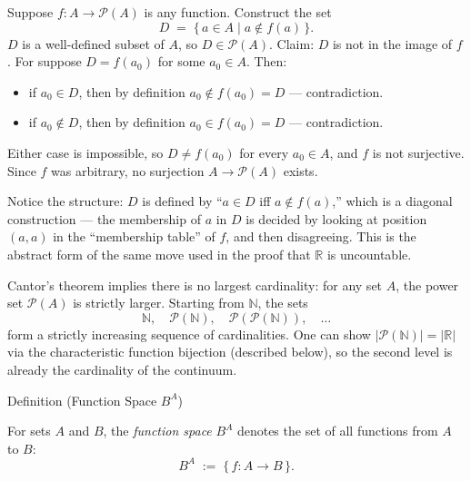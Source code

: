 \begin{remark*}
Suppose $f : A \to \mathcal{P}(A)$ is any function. Construct the set
\[
D \;=\; \{\, a \in A \mid a \notin f(a) \,\}.
\]
$D$ is a well-defined subset of $A$, so $D \in \mathcal{P}(A)$. Claim: $D$
is not in the image of $f$. For suppose $D = f(a_0)$ for some $a_0 \in A$.
Then:
\begin{itemize}
\item if $a_0 \in D$, then by definition $a_0 \notin f(a_0) = D$ --- contradiction.
\item if $a_0 \notin D$, then by definition $a_0 \in f(a_0) = D$ --- contradiction.
\end{itemize}
Either case is impossible, so $D \neq f(a_0)$ for every $a_0 \in A$, and $f$
is not surjective. Since $f$ was arbitrary, no surjection $A \to
\mathcal{P}(A)$ exists.

Notice the structure: $D$ is defined by ``$a \in D$ iff $a \notin f(a)$,''
which is a diagonal construction --- the membership of $a$ in $D$ is decided
by looking at position $(a,a)$ in the ``membership table'' of $f$, and then
disagreeing. This is the abstract form of the same move used in the proof
that $\mathbb{R}$ is uncountable.
\end{remark*}

\begin{remark*}
Cantor's theorem implies there is no largest cardinality: for any set $A$,
the power set $\mathcal{P}(A)$ is strictly larger. Starting from $\mathbb{N}$,
the sets
\[
\mathbb{N},\quad
\mathcal{P}(\mathbb{N}),\quad
\mathcal{P}(\mathcal{P}(\mathbb{N})),\quad \dots
\]
form a strictly increasing sequence of cardinalities. One can show
$|\mathcal{P}(\mathbb{N})| = |\mathbb{R}|$ via the characteristic function
bijection (described below), so the second level is already the cardinality
of the continuum.
\end{remark*}


\begin{definitionbox}{Definition (Function Space $B^A$)}
\begin{definition}\label{def:function-space}
For sets $A$ and $B$, the \emph{function space} $B^A$ denotes the set of
all functions from $A$ to $B$:
\[
B^A \;:=\; \{\, f : A \to B \,\}.
\]
\end{definition}
\end{definitionbox}

